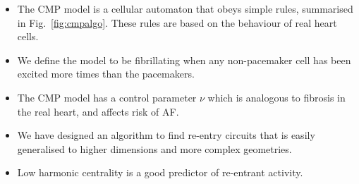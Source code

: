 \begin{itemize}
    \item The CMP model is a cellular automaton that obeys simple rules, summarised in Fig.~\ref{fig:cmpalgo}. These rules are based on the behaviour of real heart cells.
    \item We define the model to be fibrillating when any non-pacemaker cell has been excited more times than the pacemakers.
    \item The CMP model has a control parameter $\nu$ which is analogous to fibrosis in the real heart, and affects risk of AF.
    \item We have designed an algorithm to find re-entry circuits that is easily generalised to higher dimensions and more complex geometries.
    \item Low harmonic centrality is a good predictor of re-entrant activity.
\end{itemize}

